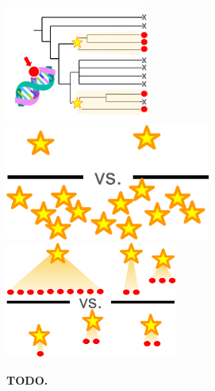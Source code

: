 \begin{figure}

\includegraphics[height=1.5in]{img/mls-schematic-mdc}
\includegraphics[height=1.5in]{img/mls-schematic-mutfreq}
\includegraphics[height=1.5in]{img/mls-schematic-fiteffect}

\caption{\textbf{TODO.}}
\label{fig:mls-schematic}

\end{figure}
